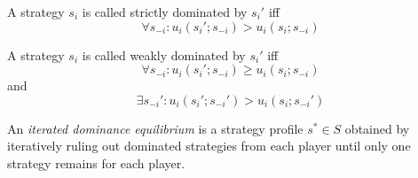 \documentclass[UTF8,11pt,colorlinks,compress,openany]{beamer}%
\begin{document}
\begin{frame}\frametitle{}
\begin{definition}
A strategy $s_i$ is called strictly dominated by $s_i'$ iff
\[\forall s_{-i}: u_i(s_i';s_{-i})>u_i(s_i;s_{-i})\]
\end{definition}
\begin{definition}
A strategy $s_i$ is called weakly dominated by $s_i'$ iff
\[\forall s_{-i}: u_i(s_i';s_{-i})\geq u_i(s_i;s_{-i})\]
and
\[\exists s_{-i}': u_i(s_i';s_{-i}')>u_i(s_i;s_{-i}')\]
\end{definition}
\begin{definition}
An \emph{iterated dominance equilibrium} is a strategy profile $s^*\in S$ obtained by iteratively ruling out dominated strategies from each player until only one strategy remains for each player.
\end{definition}
\end{frame}
\end{document}

